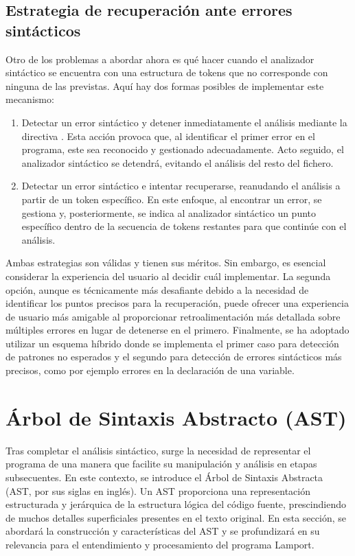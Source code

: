 \subsection{Estrategia de recuperación ante errores sintácticos}
Otro de los problemas a abordar ahora es qué hacer cuando el analizador sintáctico se encuentra con una estructura de tokens que no corresponde con ninguna de las previstas. Aquí hay dos formas posibles de implementar este mecanismo:

\begin{enumerate}
    \item Detectar un error sintáctico y detener inmediatamente el análisis mediante la directiva . Esta acción provoca que, al identificar el primer error en el programa, este sea reconocido y gestionado adecuadamente. Acto seguido, el analizador sintáctico se detendrá, evitando el análisis del resto del fichero.
    
    \item Detectar un error sintáctico e intentar recuperarse, reanudando el análisis a partir de un token específico. En este enfoque, al encontrar un error, se gestiona y, posteriormente, se indica al analizador sintáctico un punto específico dentro de la secuencia de tokens restantes para que continúe con el análisis.
\end{enumerate}

Ambas estrategias son válidas y tienen sus méritos. Sin embargo, es esencial considerar la experiencia del usuario al decidir cuál implementar. La segunda opción, aunque es técnicamente más desafiante debido a la necesidad de identificar los puntos precisos para la recuperación, puede ofrecer una experiencia de usuario más amigable al proporcionar retroalimentación más detallada sobre múltiples errores en lugar de detenerse en el primero. Finalmente, se ha adoptado utilizar un esquema híbrido donde se implementa el primer caso para detección de patrones no esperados y el segundo para detección de errores sintácticos más precisos, como por ejemplo errores en la declaración de una variable.

\section{Árbol de Sintaxis Abstracto (AST)}\label{sec:implementacionAST}
Tras completar el análisis sintáctico, surge la necesidad de representar el programa de una manera que facilite su manipulación y análisis en etapas subsecuentes. En este contexto, se introduce el Árbol de Sintaxis Abstracta (AST, por sus siglas en inglés). Un AST proporciona una representación estructurada y jerárquica de la estructura lógica del código fuente, prescindiendo de muchos detalles superficiales presentes en el texto original. En esta sección, se abordará la construcción y características del AST y se profundizará en su relevancia para el entendimiento y procesamiento del programa Lamport.

